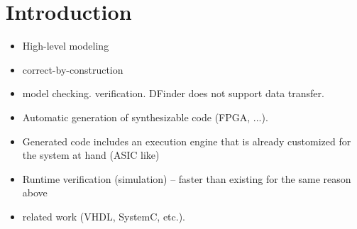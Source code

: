 \section{Introduction}
\label{sect-intro}

\begin{itemize}
\item High-level modeling 
\item correct-by-construction
\item model checking. verification. DFinder does not support data transfer. 
\item Automatic generation of synthesizable code  (FPGA, ...).
\item Generated code includes an execution engine that is already customized for the system at hand (ASIC like)
\item Runtime verification (simulation) -- faster than existing for the same reason above
\item related work (VHDL, SystemC, etc.).
\end{itemize}
